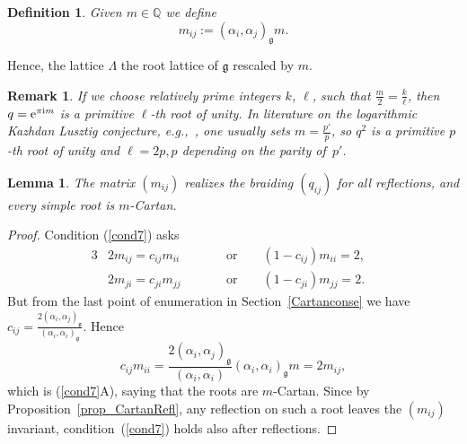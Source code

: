 \documentclass[10pt,a4paper]{amsart}
\numberwithin{equation}{section}
\newtheorem{lem}[teo]{Lemma}
\newtheorem{defin}[teo]{Definition}
\newtheorem{oss}[teo]{Remark} }
\renewcommand{\i}{\mathrm{i}}
\begin{document}
\begin{defin}\label{mCartan}
Given $m \in \mathbb{Q}$ we define
\[m_{ij} := (\alpha_i, \alpha_j)_\mathfrak{g} m.\]
\end{defin}
Hence, the lattice $\Lambda$ the root lattice of $\mathfrak{g}$ rescaled by $m$.
\begin{oss} If we choose relatively prime integers $k$, $\ell$, such that $\frac{m}{2}= \frac{k}{\ell}$, then $q={\rm e}^{\pi\i m}$ is a primitive $\ell$-th root of unity. In literature on the logarithmic Kazhdan Lusztig conjecture, e.g.,~\cite{FT10, FGST06a}, one usually sets $m= \frac{p'}{p}$, so $q^2$ is a primitive $p$-th root of unity and $\ell=2p,p$ depending on the parity of~$p'$.
\end{oss}
\begin{lem}
The matrix $(m_{ij})$ realizes the braiding $(q_{ij})$ for all reflections, and every simple root is $m$-Cartan.
\end{lem}
\begin{proof}
Condition (\ref{cond7}) asks
\begin{alignat*}{3}
&2m_{ij} = c_{ij} m_{ii}\qquad && \text{or} \qquad (1-c_{ij})m_{ii} = 2,& \\
&2m_{ji} = c_{ji} m_{jj}\qquad && \text{or} \qquad (1-c_{ji})m_{jj} = 2.&
\end{alignat*} But from the last point of enumeration in Section~\ref{Cartanconse} we have $c_{ij} = \frac{2(\alpha_i, \alpha_j)_\mathfrak{g}}{(\alpha_i, \alpha_i)_\mathfrak{g}}$. Hence
\[
c_{ij}m_{ii} = \frac{2(\alpha_i, \alpha_j)_\mathfrak{g}}{(\alpha_i, \alpha_i)}(\alpha_i, \alpha_i)_\mathfrak{g} m = 2 m_{ij},
\] which is (\ref{cond7}A), saying that the roots are $m$-Cartan.
Since by Proposition~\ref{prop_CartanRefl}, any reflection on such a root leaves the $(m_{ij})$ invariant, condition~(\ref{cond7}) holds also after reflections.
\end{proof}
\end{document}
